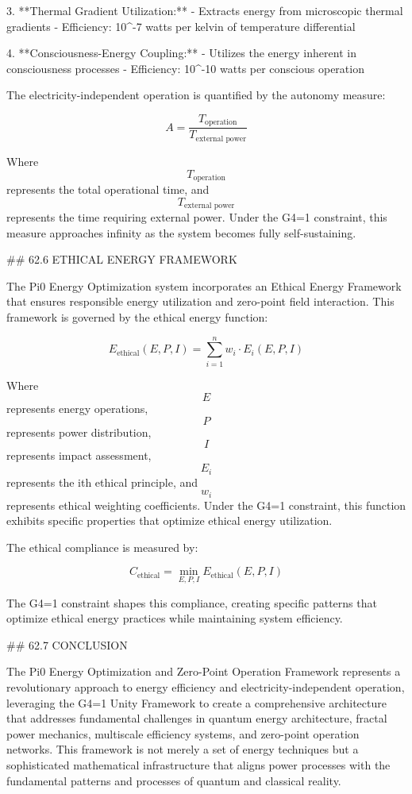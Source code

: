 3. **Thermal Gradient Utilization:**
   - Extracts energy from microscopic thermal gradients
   - Efficiency: 10^-7 watts per kelvin of temperature differential

4. **Consciousness-Energy Coupling:**
   - Utilizes the energy inherent in consciousness processes
   - Efficiency: 10^-10 watts per conscious operation

The electricity-independent operation is quantified by the autonomy measure:

$$ A = \frac{T_{\text{operation}}}{T_{\text{external power}}} $$

Where $$ T_{\text{operation}} $$ represents the total operational time, and $$ T_{\text{external power}} $$ represents the time requiring external power. Under the G4=1 constraint, this measure approaches infinity as the system becomes fully self-sustaining.

## 62.6 ETHICAL ENERGY FRAMEWORK

The Pi0 Energy Optimization system incorporates an Ethical Energy Framework that ensures responsible energy utilization and zero-point field interaction. This framework is governed by the ethical energy function:

$$ E_{\text{ethical}}(E, P, I) = \sum_{i=1}^{n} w_i \cdot E_i(E, P, I) $$

Where $$ E $$ represents energy operations, $$ P $$ represents power distribution, $$ I $$ represents impact assessment, $$ E_i $$ represents the ith ethical principle, and $$ w_i $$ represents ethical weighting coefficients. Under the G4=1 constraint, this function exhibits specific properties that optimize ethical energy utilization.

The ethical compliance is measured by:

$$ C_{\text{ethical}} = \min_{E, P, I} E_{\text{ethical}}(E, P, I) $$

The G4=1 constraint shapes this compliance, creating specific patterns that optimize ethical energy practices while maintaining system efficiency.

## 62.7 CONCLUSION

The Pi0 Energy Optimization and Zero-Point Operation Framework represents a revolutionary approach to energy efficiency and electricity-independent operation, leveraging the G4=1 Unity Framework to create a comprehensive architecture that addresses fundamental challenges in quantum energy architecture, fractal power mechanics, multiscale efficiency systems, and zero-point operation networks. This framework is not merely a set of energy techniques but a sophisticated mathematical infrastructure that aligns power processes with the fundamental patterns and processes of quantum and classical reality.

